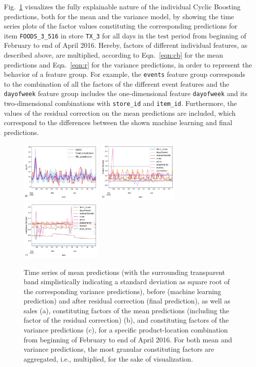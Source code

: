 \documentclass[BCOR=1mm, DIV=calc,10pt,
twoside=true,
twocolumn,
headings=normal]{scrartcl}
\newcommand{\fig}{Fig.~}
\newcommand{\eqn}{Eqn.~}
\begin{document}
\fig \ref{fig:factor_plots} visualizes the fully explainable nature of the individual Cyclic Boosting predictions, both for the mean and the variance model, by showing the time series plots of the factor values constituting the corresponding predictions for item \texttt{FOODS\_3\_516} in store \texttt{TX\_3} for all days in the test period from beginning of February to end of April 2016. Hereby, factors of different individual features, as described above, are multiplied, according to \eqn \eqref{eqn:cb} for the mean predictions and \eqn \eqref{eqn:r} for the variance predictions, in order to represent the behavior of a feature group. For example, the \texttt{events} feature group corresponds to the combination of all the factors of the different event features and the \texttt{dayofweek} feature group includes the one-dimensional feature \texttt{dayofweek} and its two-dimensional combinations with \texttt{store\_id} and \texttt{item\_id}. Furthermore, the values of the residual correction on the mean predictions are included, which correspond to the differences between the shown machine learning and final predictions.

\begin{figure}
\begin{center}
\includegraphics[width=4cm]{ts_item_16_store_6}
\includegraphics[width=4cm]{factors_ts}
\includegraphics[width=4cm]{factors_ts_width}
\caption{\label{fig:factor_plots} Time series of mean predictions (with the surrounding transparent band simplistically indicating a standard deviation as square root of the corresponding variance predictions), before (machine learning prediction) and after residual correction (final prediction), as well as sales (a), constituting factors of the mean predictions (including the factor of the residual correction) (b), and constituting factors of the variance predictions (c), for a specific product-location combination from beginning of February to end of April 2016. For both mean and variance predictions, the most granular constituting factors are aggregated, i.e., multiplied, for the sake of visualization.}
\end{center}
\end{figure}
\end{document}
